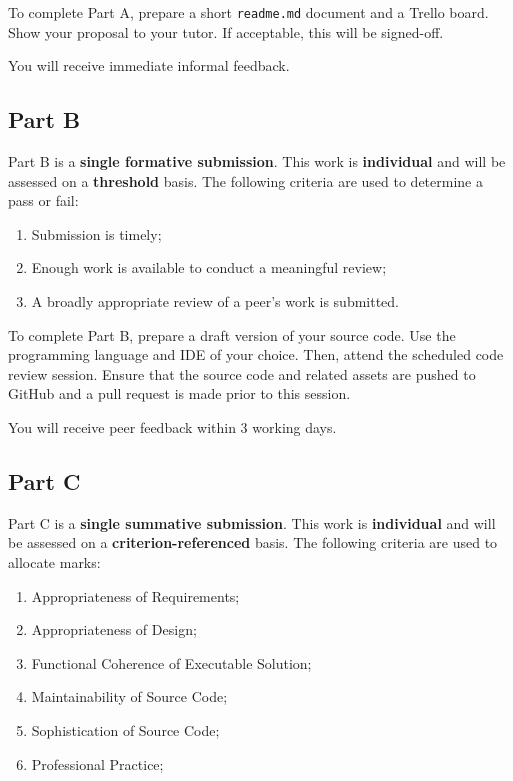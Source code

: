 \documentclass{../fal_assignment}
\begin{document}
To complete Part A, prepare a short \texttt{readme.md} document and a Trello board. Show your proposal to your tutor.  If acceptable, this will be signed-off. 

You will receive immediate informal feedback.

\subsection*{Part B}

Part B is a \textbf{single formative submission}. This work is \textbf{individual} and will be assessed on a \textbf{threshold} basis. The following criteria are used to determine a pass or fail:

\begin{enumerate}[label=(\alph*)]
	\item Submission is timely;
	\item Enough work is available to conduct a meaningful review;
	\item A broadly appropriate review of a peer's work is submitted.
\end{enumerate}

To complete Part B, prepare a draft version of your source code. Use the programming language and IDE of your choice. Then, attend the scheduled code review session. Ensure that the source code and related assets are pushed to GitHub and a pull request is made prior to this session. 

You will receive peer feedback within 3 working days.

\subsection*{Part C}

Part C is a \textbf{single summative submission}. This work is \textbf{individual} and will be assessed on a \textbf{criterion-referenced} basis. The following criteria are used to allocate marks:

\begin{enumerate}[label=(\alph*)]
	\item Appropriateness of Requirements;
	\item Appropriateness of Design;
	\item Functional Coherence of Executable Solution;
	\item Maintainability of Source Code;
	\item Sophistication of Source Code;
	\item Professional Practice;
\end{enumerate}
\end{document}
